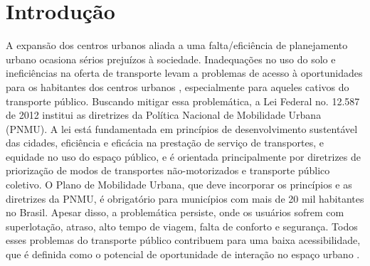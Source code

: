 \documentclass[        
    a4paper,          %
    12pt,             %
    chapter=TITLE,    %
    section=Title,    %
    subsection=Title, %
    oneside,          %
    english,          %
    spanish,          %
    brazil,           %
    fleqn             %
]{abntex2}
\begin{document}
	\imprimircapa
	\imprimirfolhaderosto{}
	\imprimirfolhadeaprovacao
	\renewcommand*\listfigurename{Lista de Figuras} %
	\imprimirlistadeilustracoes
	\imprimirlistadetabelas
	\imprimirsumario
	
	\setcounter{table}{0}%
	
	\textual
  \hypertarget{introducao}{%
  \chapter{Introdução}\label{introducao}}
  
  A expansão dos centros urbanos aliada a uma falta/eficiência de planejamento urbano ocasiona sérios prejuízos à sociedade. Inadequações no uso do solo e ineficiências na oferta de transporte levam a problemas de acesso à oportunidades para os habitantes dos centros urbanos \citep{Garcia2018}, especialmente para aqueles cativos do transporte público. Buscando mitigar essa problemática, a Lei Federal no. 12.587 de 2012 institui as diretrizes da Política Nacional de Mobilidade Urbana (PNMU). A lei está fundamentada em princípios de desenvolvimento sustentável das cidades, eficiência e eficácia na prestação de serviço de transportes, e equidade no uso do espaço público, e é orientada principalmente por diretrizes de priorização de modos de transportes não-motorizados e transporte público coletivo. O Plano de Mobilidade Urbana, que deve incorporar os princípios e as diretrizes da PNMU, é obrigatório para municípios com mais de 20 mil habitantes no Brasil. Apesar disso, a problemática persiste, onde os usuários sofrem com superlotação, atraso, alto tempo de viagem, falta de conforto e segurança. Todos esses problemas do transporte público contribuem para uma baixa acessibilidade, que é definida como o potencial de oportunidade de interação no espaço urbano \citep{Hansen1959}.
  
\end{document}
